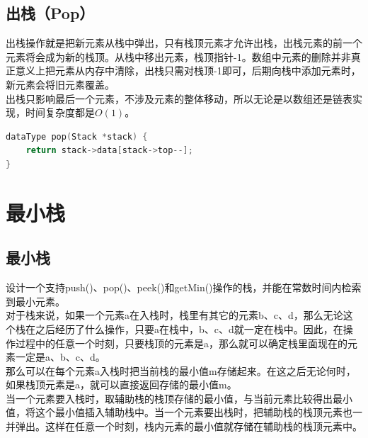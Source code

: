 \vspace{0.5cm}

\subsection{出栈（Pop）}

出栈操作就是把新元素从栈中弹出，只有栈顶元素才允许出栈，出栈元素的前一个元素将会成为新的栈顶。从栈中移出元素，栈顶指针-1。数组中元素的删除并非真正意义上把元素从内存中清除，出栈只需对栈顶-1即可，后期向栈中添加元素时，新元素会将旧元素覆盖。\\

出栈只影响最后一个元素，不涉及元素的整体移动，所以无论是以数组还是链表实现，时间复杂度都是$ O(1) $。\\


\begin{lstlisting}[language=C]
dataType pop(Stack *stack) {
    return stack->data[stack->top--];
}
\end{lstlisting}

\newpage

\section{最小栈}

\subsection{最小栈}

设计一个支持push()、pop()、peek()和getMin()操作的栈，并能在常数时间内检索到最小元素。\\

对于栈来说，如果一个元素a在入栈时，栈里有其它的元素b、c、d，那么无论这个栈在之后经历了什么操作，只要a在栈中，b、c、d就一定在栈中。因此，在操作过程中的任意一个时刻，只要栈顶的元素是a，那么就可以确定栈里面现在的元素一定是a、b、c、d。\\

那么可以在每个元素a入栈时把当前栈的最小值m存储起来。在这之后无论何时，如果栈顶元素是a，就可以直接返回存储的最小值m。\\

当一个元素要入栈时，取辅助栈的栈顶存储的最小值，与当前元素比较得出最小值，将这个最小值插入辅助栈中。当一个元素要出栈时，把辅助栈的栈顶元素也一并弹出。这样在任意一个时刻，栈内元素的最小值就存储在辅助栈的栈顶元素中。\\


